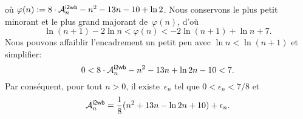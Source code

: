 où \(\varphi(n) := 8 \cdot \M{\fun{i2wb}}{n} - n^2 - 13n - 10 + \ln
2\). Nous conservons le plus petit minorant et le plus grand majorant
de~\(\varphi(n)\), d'où
\begin{equation*}
\ln(n+1) - 2\ln n < \varphi(n) < -2\ln(n+1) + \ln n + 7.
\end{equation*}
Nous pouvons affaiblir l'encadrement un petit peu avec \(\ln n <
\ln(n+1)\) et simplifier:
\begin{equation*}
0 < 8 \cdot \M{\fun{i2wb}}{n} - n^2 - 13n + \ln 2n - 10 < 7.
\end{equation*}
Par conséquent, pour tout \(n > 0\), il existe~\(\epsilon_n\) tel que
\(0 < \epsilon_n < 7/8\) et
\begin{equation}
\M{\fun{i2wb}}{n}
  = \frac{1}{8}(n^2 + 13n - \ln 2n + 10) + \epsilon_n.
\label{eq:ave_i2wb}
\end{equation}
